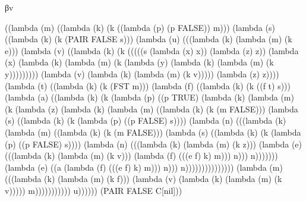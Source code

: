 \documentclass[ms,electronic,twosidetoc,letterpaper,chaptercenter,parttop]{byumsphd}
\begin{document}
\begin{theorem}
βv
\begin{schemedisplay}
((lambda (m) ((lambda (k) (k ((lambda (p) (p FALSE)) m)))
        (lambda (s) ((lambda (k) (k (PAIR FALSE s)))
               (lambda (u) (((lambda (k) (lambda (m) (k e)))
                       (lambda (v) ((lambda (k) (k (((((s (lambda (x) x)) (lambda (z) z))
                                          (lambda (x) (lambda (k) (lambda (m) (k (lambda (y) (lambda (k) (lambda (m) (k y)))))))))
                                         (lambda (v) (lambda (k) (lambda (m) (k v))))) (lambda (z) z))))
                              (lambda (t) ((lambda (k) (k (FST m)))
                                     (lambda (f) ((lambda (k) (k ((f t) s)))
                                            (lambda (a) ((lambda (k) (k (lambda (p) ((p TRUE)
                                                                   (lambda (k) (lambda (m) (k (lambda (z) (lambda (k) (lambda (m) ((lambda (k) (k (m FALSE)))
                                                                                                     (lambda (s) ((lambda (k) (k (lambda (p) ((p FALSE) s))))
                                                                                                            (lambda (n) (((lambda (k) (lambda (m) ((lambda (k) (k (m FALSE)))
                                                                                                                                 (lambda (s) ((lambda (k) (k (lambda (p) ((p FALSE) s))))
                                                                                                                                        (lambda (n) (((lambda (k) (lambda (m) (k z)))
                                                                                                                                                (lambda (e) (((lambda (k) (lambda (m) (k v)))
                                                                                                                                                        (lambda (f) (((e f) k) m))) n))) n)))))))
                                                                                                                    (lambda (e) ((a (lambda (f) (((e f) k) m))) n))) n)))))))))))))))
                                                   (lambda (m) (((lambda (k) (lambda (m) (k f)))
                                                           (lambda (v) (lambda (k) (lambda (m) (k v))))) m))))))))))) u))))))
 (PAIR FALSE C[nil]))
\end{schemedisplay}


\end{theorem}
\end{document}
